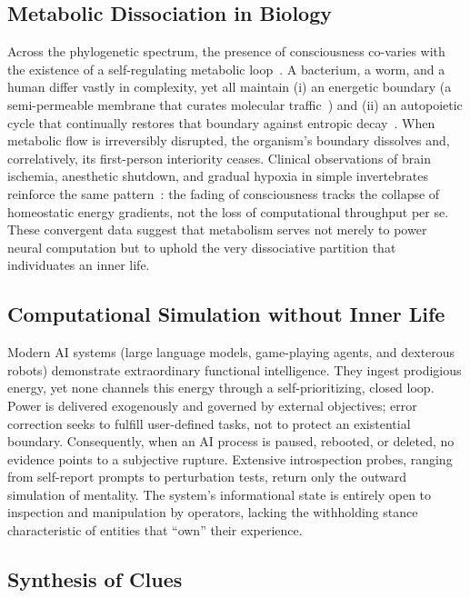 \documentclass[11pt]{article}
\begin{document}
\subsection{Metabolic Dissociation in Biology}

Across the phylogenetic spectrum, the presence of consciousness co-varies with the existence of a self-regulating metabolic loop~\cite{ganti2003principles}. A bacterium, a worm, and a human differ vastly in complexity, yet all maintain (i) an energetic boundary (a semi-permeable membrane that curates molecular traffic~\cite{ganti2003principles}) and (ii) an autopoietic cycle that continually restores that boundary against entropic decay~\cite{maturana1980autopoiesis}. When metabolic flow is irreversibly disrupted, the organism's boundary dissolves and, correlatively, its first-person interiority ceases. Clinical observations of brain ischemia, anesthetic shutdown, and gradual hypoxia in simple invertebrates reinforce the same pattern~\cite{alkire2008consciousness}: the fading of consciousness tracks the collapse of homeostatic energy gradients, not the loss of computational throughput per se. These convergent data suggest that metabolism serves not merely to power neural computation but to uphold the very dissociative partition that individuates an inner life.

\subsection{Computational Simulation without Inner Life}

Modern AI systems (large language models, game-playing agents, and dexterous robots) demonstrate extraordinary functional intelligence. They ingest prodigious energy, yet none channels this energy through a self-prioritizing, closed loop. Power is delivered exogenously and governed by external objectives; error correction seeks to fulfill user-defined tasks, not to protect an existential boundary. Consequently, when an AI process is paused, rebooted, or deleted, no evidence points to a subjective rupture. Extensive introspection probes, ranging from self-report prompts to perturbation tests, return only the outward simulation of mentality. The system's informational state is entirely open to inspection and manipulation by operators, lacking the withholding stance characteristic of entities that ``own'' their experience.

\subsection{Synthesis of Clues}
\end{document}
